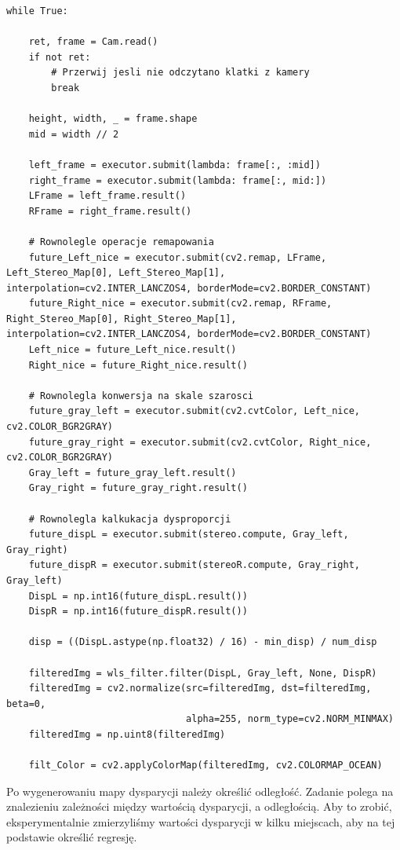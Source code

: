 \documentclass[magisterska]{pracadypl}
\begin{document}
\begin{lstlisting}[style=mypython]
while True:

    ret, frame = Cam.read()
    if not ret:
        # Przerwij jesli nie odczytano klatki z kamery
        break

    height, width, _ = frame.shape
    mid = width // 2

    left_frame = executor.submit(lambda: frame[:, :mid])
    right_frame = executor.submit(lambda: frame[:, mid:])
    LFrame = left_frame.result()
    RFrame = right_frame.result()

    # Rownolegle operacje remapowania 
    future_Left_nice = executor.submit(cv2.remap, LFrame, Left_Stereo_Map[0], Left_Stereo_Map[1], interpolation=cv2.INTER_LANCZOS4, borderMode=cv2.BORDER_CONSTANT)
    future_Right_nice = executor.submit(cv2.remap, RFrame, Right_Stereo_Map[0], Right_Stereo_Map[1], interpolation=cv2.INTER_LANCZOS4, borderMode=cv2.BORDER_CONSTANT)
    Left_nice = future_Left_nice.result()
    Right_nice = future_Right_nice.result()

    # Rownolegla konwersja na skale szarosci
    future_gray_left = executor.submit(cv2.cvtColor, Left_nice, cv2.COLOR_BGR2GRAY)
    future_gray_right = executor.submit(cv2.cvtColor, Right_nice, cv2.COLOR_BGR2GRAY)
    Gray_left = future_gray_left.result()
    Gray_right = future_gray_right.result()

    # Rownolegla kalkukacja dysproporcji
    future_dispL = executor.submit(stereo.compute, Gray_left, Gray_right)
    future_dispR = executor.submit(stereoR.compute, Gray_right, Gray_left)
    DispL = np.int16(future_dispL.result())
    DispR = np.int16(future_dispR.result())

    disp = ((DispL.astype(np.float32) / 16) - min_disp) / num_disp

    filteredImg = wls_filter.filter(DispL, Gray_left, None, DispR)
    filteredImg = cv2.normalize(src=filteredImg, dst=filteredImg, beta=0, 
                                alpha=255, norm_type=cv2.NORM_MINMAX)
    filteredImg = np.uint8(filteredImg)

    filt_Color = cv2.applyColorMap(filteredImg, cv2.COLORMAP_OCEAN)
\end{lstlisting}

Po wygenerowaniu mapy dysparycji należy określić odległość. Zadanie polega na znalezieniu zależności między wartością dysparycji, a odległością. Aby to zrobić, eksperymentalnie zmierzyliśmy wartości dysparycji w kilku miejscach, aby na tej podstawie określić regresję.
\end{document}

